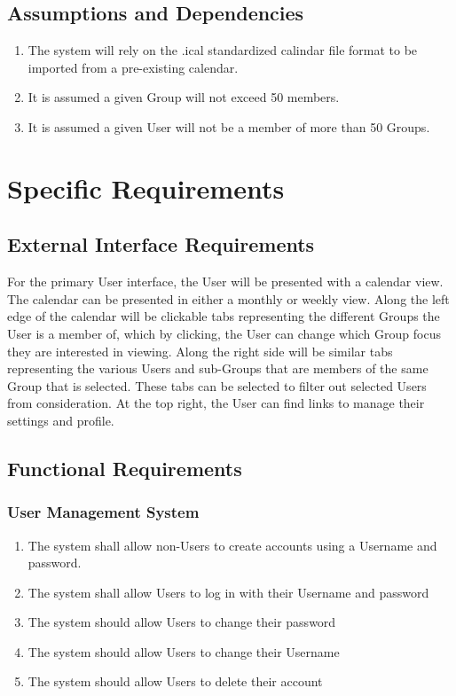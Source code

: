 \documentclass{scrreprt}
\begin{document}
\section{Assumptions and Dependencies}
\begin{enumerate}
\item The system will rely on the .ical standardized calindar file format to
be imported from a pre-existing calendar.
\item It is assumed a given Group will not exceed 50 members.
\item It is assumed a given User will not be a member of more than 50 Groups.
\end{enumerate}


\chapter{Specific Requirements}

\section{External Interface Requirements}
For the primary User interface, the User will be presented with a calendar view.
The calendar can be presented in either a monthly or weekly view. Along the left
edge of the calendar will be clickable tabs representing the different Groups
the User is a member of, which by clicking, the User can change which Group
focus they are interested in viewing. Along the right side will be similar tabs
representing the various Users and sub-Groups that are members of the same
Group that is selected. These tabs can be selected to filter out selected Users
from consideration. At the top right, the User can find links to manage their
settings and profile.
\section{Functional Requirements}

\subsection{User Management System}
    \begin{enumerate}
    \item The system shall allow non-Users to create accounts using a Username and password.
    \item The system shall allow Users to log in with their Username and password
    \item The system should allow Users to change their password
    \item The system should allow Users to change their Username
    \item The system should allow Users to delete their account
    \end{enumerate}
\end{document}

